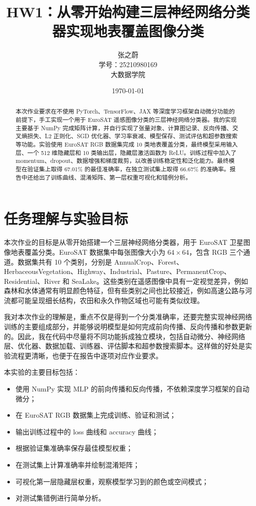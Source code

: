 \documentclass[UTF8,12pt,a4paper]{ctexart}
\title{HW1：从零开始构建三层神经网络分类器实现地表覆盖图像分类}
\author{张之蔚 \\ 学号：25210980169 \\ 大数据学院}
\date{\today}
\begin{document}
\maketitle

\begin{abstract}
本次作业要求在不使用 PyTorch、TensorFlow、JAX 等深度学习框架自动微分功能的前提下，手工实现一个用于 EuroSAT 遥感图像分类的三层神经网络分类器。我的实现主要基于 NumPy 完成矩阵计算，并自行实现了张量对象、计算图记录、反向传播、交叉熵损失、L2 正则化、SGD 优化器、学习率衰减、模型保存、测试评估和超参数搜索等功能。实验使用 EuroSAT RGB 数据集完成 10 类地表覆盖分类，最终模型采用输入层、一个 512 维隐藏层和 10 类输出层，隐藏层激活函数为 ReLU。训练过程中加入了 momentum、dropout、数据增强和梯度裁剪，以改善训练稳定性和泛化能力。最终模型在验证集上取得 67.01\% 的最佳准确率，在独立测试集上取得 66.67\% 的准确率。报告中还给出了训练曲线、混淆矩阵、第一层权重可视化和错例分析。
\end{abstract}

\section{任务理解与实验目标}

本次作业的目标是从零开始搭建一个三层神经网络分类器，用于 EuroSAT 卫星图像地表覆盖分类。EuroSAT 数据集中每张图像大小为 $64 \times 64$，包含 RGB 三个通道。数据集共有 10 个类别，分别是 AnnualCrop、Forest、HerbaceousVegetation、Highway、Industrial、Pasture、PermanentCrop、Residential、River 和 SeaLake。这些类别在遥感图像中具有一定视觉差异，例如森林和水体通常有明显颜色特征，但有些类别之间也比较接近，例如高速公路与河流都可能呈现细长结构，农田和永久作物区域也可能有类似纹理。

我对本次作业的理解是，重点不仅是得到一个分类准确率，还要完整实现神经网络训练的主要组成部分，并能够说明模型是如何完成前向传播、反向传播和参数更新的。因此，我在代码中尽量将不同功能拆成独立模块，包括自动微分、神经网络层、优化器、数据加载、训练器、评估脚本和超参数搜索脚本。这样做的好处是实验流程更清晰，也便于在报告中逐项对应作业要求。

本实验的主要目标包括：

\begin{itemize}
    \item 使用 NumPy 实现 MLP 的前向传播和反向传播，不依赖深度学习框架的自动微分；
    \item 在 EuroSAT RGB 数据集上完成训练、验证和测试；
    \item 输出训练过程中的 loss 曲线和 accuracy 曲线；
    \item 根据验证集准确率保存最佳模型权重；
    \item 在测试集上计算准确率并绘制混淆矩阵；
    \item 可视化第一层隐藏层权重，观察模型学习到的颜色或空间模式；
    \item 对测试集错例进行简单分析。
\end{itemize}
\end{document}
